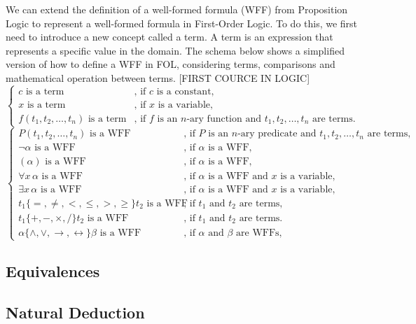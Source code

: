 We can extend the definition of a well-formed formula (WFF) from Proposition Logic to represent a well-formed formula in First-Order Logic. To do this, we first need to introduce a new concept called a term. A term is an expression that represents a specific value in the domain. The schema below shows a simplified version of how to define a WFF in FOL, considering terms, comparisons and mathematical operation between terms.
[FIRST COURCE IN LOGIC]
\[
\left\{
\begin{array}{ll}
c \text{ is a term} & \text{, if } c \text{ is a constant,} \\
x \text{ is a term} & \text{, if } x \text{ is a variable,} \\
f(t_1, t_2, \dots, t_n) \text{ is a term} & \text{, if } f \text{ is an \(n\)-ary function and } t_1, t_2, \dots, t_n \text{ are terms.}
\end{array}
\right.
\]
\[
\left\{
\begin{array}{ll}
P(t_1, t_2, \dots, t_n) \text{ is a WFF} & \text{, if } P \text{ is an \(n\)-ary predicate and } t_1, t_2, \dots, t_n \text{ are terms,} \\
\neg \alpha \text{ is a WFF} & \text{, if } \alpha \text{ is a WFF,} \\
(\alpha) \text{ is a WFF} & \text{, if } \alpha \text{ is a WFF,} \\
\forall x \, \alpha \text{ is a WFF} & \text{, if } \alpha \text{ is a WFF and } x \text{ is a variable,} \\
\exists x \, \alpha \text{ is a WFF} & \text{, if } \alpha \text{ is a WFF and } x \text{ is a variable,} \\
t_1 \mathbin{\{=, \neq, <, \leq, >, \geq\}} t_2 \text{ is a WFF} & \text{, if } t_1 \text{ and } t_2 \text{ are terms,} \\
t_1 \mathbin{\{+, -, \times, /\}} t_2 \text{ is a WFF} & \text{, if } t_1 \text{ and } t_2 \text{ are terms.} \\
\alpha \mathbin{\{\land, \lor, \rightarrow, \leftrightarrow\}} \beta \text{ is a WFF} & \text{, if } \alpha \text{ and } \beta \text{ are WFFs,} 
\end{array}
\right.
\]

\subsection{Equivalences}
\subsection{Natural Deduction}



